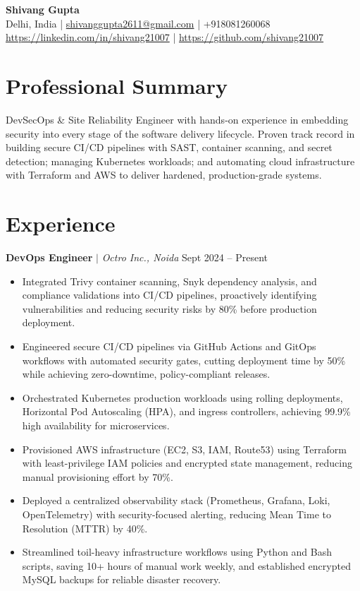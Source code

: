 \documentclass[11pt, letterpaper]{article}
\begin{document}
\begin{center}
    {\LARGE \textbf{Shivang Gupta}} \\ \vspace{2pt}
    Delhi, India \;|\;
    \href{mailto:shivanggupta2611@gmail.com}{shivanggupta2611@gmail.com} \;|\;
    +918081260068 \\ \vspace{2pt}
    \href{https://linkedin.com/in/shivang21007}{https://linkedin.com/in/shivang21007} \;|\;
    \href{https://github.com/shivang21007}{https://github.com/shivang21007}
\end{center}

\section*{Professional Summary}
\vspace{2pt}
DevSecOps \& Site Reliability Engineer with hands-on experience in embedding security into every stage of the software delivery lifecycle. Proven track record in building secure CI/CD pipelines with SAST, container scanning, and secret detection; managing Kubernetes workloads; and automating cloud infrastructure with Terraform and AWS to deliver hardened, production-grade systems.

\section*{Experience}

\vspace{2pt}
\textbf{DevOps Engineer} $|$ \emph{Octro Inc., Noida} \hfill Sept 2024 -- Present
\begin{itemize}
    \item Integrated Trivy container scanning, Snyk dependency analysis, and compliance validations into CI/CD pipelines, proactively identifying vulnerabilities and reducing security risks by 80\% before production deployment.
    \item Engineered secure CI/CD pipelines via GitHub Actions and GitOps workflows with automated security gates, cutting deployment time by 50\% while achieving zero-downtime, policy-compliant releases.
    \item Orchestrated Kubernetes production workloads using rolling deployments, Horizontal Pod Autoscaling (HPA), and ingress controllers, achieving 99.9\% high availability for microservices.
    \item Provisioned AWS infrastructure (EC2, S3, IAM, Route53) using Terraform with least-privilege IAM policies and encrypted state management, reducing manual provisioning effort by 70\%.
    \item Deployed a centralized observability stack (Prometheus, Grafana, Loki, OpenTelemetry) with security-focused alerting, reducing Mean Time to Resolution (MTTR) by 40\%.
    \item Streamlined toil-heavy infrastructure workflows using Python and Bash scripts, saving 10+ hours of manual work weekly, and established encrypted MySQL backups for reliable disaster recovery.
\end{itemize}
\end{document}

